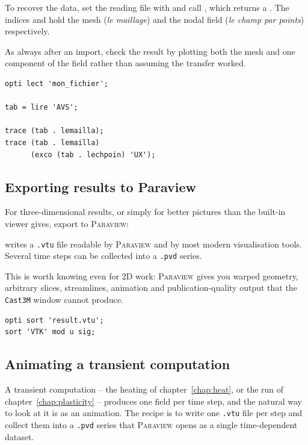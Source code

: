 \begin{castemcom}
To recover the data, set the reading file with  and call
, which returns a . The indices  and
 hold the mesh (\emph{le maillage}) and the nodal field
(\emph{le champ par points}) respectively.

As always after an import, check the result by plotting both the mesh and one
component of the field rather than assuming the transfer worked.
\end{castemcom}
\begin{castemlines}
\begin{verbatim}
opti lect 'mon_fichier';

tab = lire 'AVS';

trace (tab . lemailla);
trace (tab . lemailla)
      (exco (tab . lechpoin) 'UX');
\end{verbatim}
\end{castemlines}

\subsection{Exporting results to Paraview}

For three-dimensional results, or simply for better pictures than the
built-in viewer gives, export to \textsc{Paraview}:

\begin{castemcom}
 writes a \texttt{.vtu} file readable by \textsc{Paraview} and
by most modern visualisation tools. Several time steps can be collected into
a \texttt{.pvd} series.

This is worth knowing even for 2D work: \textsc{Paraview} gives you warped
geometry, arbitrary slices, streamlines, animation and publication-quality
output that the \texttt{Cast3M} window cannot produce.
\end{castemcom}
\begin{castemlines}
\begin{verbatim}
opti sort 'result.vtu';
sort 'VTK' mod u sig;
\end{verbatim}
\end{castemlines}

\subsection{Animating a transient computation}
\label{sec:io:movie}

%
A transient computation -- the heating of
chapter~\ref{chap:heat}, or the  run of
chapter~\ref{chap:plasticity} -- produces one field per time step, and the
natural way to look at it is as an animation. The recipe is to write one
\texttt{.vtu} file per step and collect them into a \texttt{.pvd} series
that \textsc{Paraview} opens as a single time-dependent dataset.


